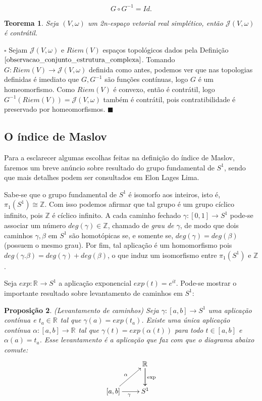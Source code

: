\documentclass[12pt]{book}
\newtheorem{teorema}{Teorema}[section]
\newtheorem{proposicao}[teorema]{Proposição}
\newenvironment{prova}[1]{$\square$ #1}{\hfill$\blacksquare$}
\newcommand{\estruturascomplexaspadrao}{\mathcal{J}(V, \omega)}
\newcommand{\produtosinternos}[1]{Riem(#1)}
\newcommand{\real}[1]{\mathbb{R}^{#1}}
\newcommand{\vermelho}[1]{{\color{red}#1}}
\begin{document}
	$$
	G\circ G^{-1} = Id.
	$$
	
	\begin{teorema}
		Seja $(V,\omega)$ um 2n-espaço vetorial real simplético, então $\estruturascomplexaspadrao$ é contrátil.
	\end{teorema}
	\begin{prova}
		Sejam $\estruturascomplexaspadrao$ e $\produtosinternos{V}$ espaços topológicos dados pela Definição $\ref{observacao_conjunto_estrutura_complexa}$. Tomando $G:\produtosinternos{V} \to \estruturascomplexaspadrao$ definida como antes, \vermelho{podemos ver que nas topologias definidas é imediato que $G, G^{-1}$ são funções contínuas}, logo $G$ é um homeomorfismo. Como $\produtosinternos{V}$ é convexo, então é contrátil, logo $G^{-1}(\produtosinternos{V}) = \estruturascomplexaspadrao$ também é contrátil, pois contratibilidade é preservado por homeomorfismos.
	\end{prova}
	
	\subsection{O índice de Maslov}
	Para a esclarecer algumas escolhas feitas na definição do índice de Maslov, faremos um breve anúncio sobre resultado do grupo fundamental de $S^{1}$, sendo que mais detalhes podem ser consultados em \vermelho{Elon Lages Lima}.
	
	Sabe-se que o grupo fundamental de $S^{1}$ é isomorfo aos inteiros, isto é, $\pi_{1}(S^{1}) \cong \mathbb{Z}$. Com isso podemos afirmar que tal grupo é um grupo cíclico infinito, pois $\mathbb{Z}$ é cíclico infinito. A cada caminho fechado $\gamma:[0,1] \to S^{1}$ pode-se associar um número $deg(\gamma) \in \mathbb{Z}$, chamado de \textit{grau de $\gamma$}, de modo que dois caminhos $\gamma, \beta$ em $S^{1}$ são homotópicas se, e somente se, $deg(\gamma) = deg(\beta)$ (possuem o mesmo grau). Por fim, tal aplicação é um homomorfismo pois $deg(\gamma.\beta)=deg(\gamma)+deg(\beta)$, o que induz um isomorfismo entre $\pi_{1}(S^{1})$ e $\mathbb{Z}$.
	
	Seja $exp:\real{} \to S^{1}$ a aplicação exponencial $exp(t) = e^{it}$. Pode-se mostrar o importante resultado sobre levantamento de caminhos em $S^{1}$:
	
	\begin{proposicao}\label{proposicao_levantamento_curvas}
		(Levantamento de caminhos) Seja $\gamma:[a,b] \to S^{1}$ uma aplicação contínua e $t_{a}\in \real{}$ tal que $\gamma(a) = exp(t_{a})$. Existe uma única aplicação contínua $\alpha:[a,b] \to \real{}$ tal que $\gamma(t) = exp(\alpha(t))$ para todo $t\in [a,b]$ e $\alpha(a) = t_{a}$. Esse levantamento é a aplicação que faz com que o diagrama abaixo comute:
		$$
		\xymatrix{
			& \real{}\ar[d]\ar[d]^{\text{exp}}
			\\
			[a,b]\ar[ur]^{\alpha} \ar[r]_{\gamma} & S^{1}
		}
		$$
	\end{proposicao}
	
\end{document}
